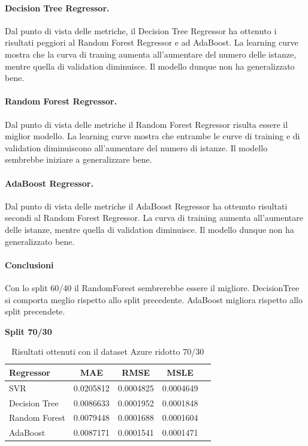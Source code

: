 \paragraph{\textbf{Decision Tree Regressor}.}
Dal punto di vista delle metriche, il Decision Tree Regressor ha ottenuto i risultati peggiori al Random Forest Regressor e ad AdaBoost.
La learning curve mostra che la curva di traning aumenta all'aumentare del numero delle istanze, mentre quella di validation diminuisce. Il modello dunque non ha generalizzato bene.
\paragraph{\textbf{Random Forest Regressor}.}
Dal punto di vista delle metriche il Random Forest Regressor risulta essere il miglior modello.
La learning curve mostra che entrambe le curve di training e di validation diminuiscono all'aumentare del numero di istanze. Il modello sembrebbe iniziare a generalizzare bene.
\paragraph{\textbf{AdaBoost Regressor}.}
Dal punto di vista delle metriche il AdaBoost Regressor ha ottenuto risultati secondi al Random Forest Regressor. La curva di training aumenta all'aumentare delle istanze, mentre quella di validation diminuisce. Il modello dunque non ha generalizzato bene.

\paragraph{\textbf{Conclusioni}} Con lo split 60/40 il RandomForest sembrerebbe essere il migliore. DecisionTree si comporta meglio rispetto allo split precedente. AdaBoost migliora rispetto allo split precendete.

\newpage

\noindent\textbf{Split 70/30}


\begin{table}[H]
    \centering
    \begin{tabular}{|>{\centering\arraybackslash}m{5cm}|c|c|c|c|}
        \hline
        \textbf{Regressor} & \textbf{MAE} & \textbf{RMSE} & \textbf{MSLE} \\ [10pt]
        \hline
        SVR & 0.0205812 & 0.0004825 & 0.0004649 \\ [10pt]
        \hline
        Decision Tree & 0.0086633 & 0.0001952 & 0.0001848 \\ [10pt]
        \hline
        Random Forest & 0.0079448 & 0.0001688 & 0.0001604 \\ [10pt]
        \hline
        AdaBoost & 0.0087171 & 0.0001541 & 0.0001471 \\ [10pt]
        \hline
    \end{tabular}
    \caption{Risultati ottenuti con il dataset Azure ridotto 70/30}
    \label{tab:results}
\end{table}


